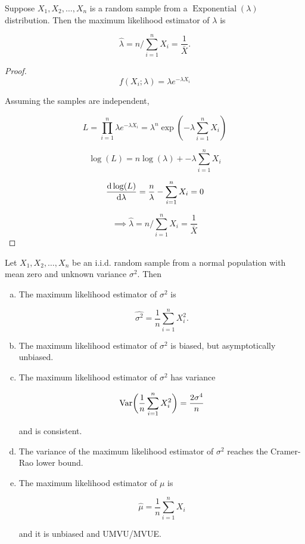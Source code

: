\begin{proposition} Suppose \(X_1, X_2, \ldots, X_n\) is a random sample from a \(\operatorname{Exponential}(\lambda)\) distribution. Then the maximum likelihood estimator of \(\lambda\) is

\[
\hat{\lambda} = n / \sum_{i=1}^n X_i = \frac{1}{\bar{X}}.
\]

\end{proposition}

\begin{proof}

\[
f(X_i; \lambda) = \lambda e^{-\lambda X_i}
\]

Assuming the samples are independent,

\[
L = \prod_{i=1}^n \lambda e^{-\lambda X_i} = \lambda^n \exp(-\lambda \sum_{i=1}^n X_i)
\]

\[
\log(L) = n \log(\lambda) + -\lambda \sum_{i=1}^n X_i
\]

\[
\deriv{\log(L)}{\lambda} = \frac{n}{\lambda} - \sum_{i=1}^n X_i = 0
\]

\[
\implies 
\hat{\lambda} = n / \sum_{i=1}^n X_i = \frac{1}{\bar{X}}
\]


\end{proof}

\begin{proposition} Let \(X_1, X_2, \ldots, X_n\) be an i.i.d. random sample from a normal population with mean zero and unknown variance \(\sigma^2\). Then

\begin{enumerate}[(a)]

\item The maximum likelihood estimator of \(\sigma^2\) is

\[
\hat{\sigma^2} = \frac{1}{n} \sum_{i=1}^n X_i^2.
\]

\item The maximum likelihood estimator of \(\sigma^2\) is biased, but asymptotically unbiased.

\item The maximum likelihood estimator of \(\sigma^2\) has variance

\[
\Var \bigg( \frac{1}{n} \sum_{i=1}^n X_i^2 \bigg)  =  \frac{2 \sigma^4}{n}
\]

and is consistent.

\item The variance of the maximum likelihood estimator of \(\sigma^2\) reaches the Cramer-Rao lower bound.

\item The maximum likelihood estimator of \(\mu\) is

\[
\hat{\mu} = \frac{1}{n} \sum_{i=1}^n X_i
\]

and it is unbiased and UMVU/MVUE.

\end{enumerate}

\end{proposition}

